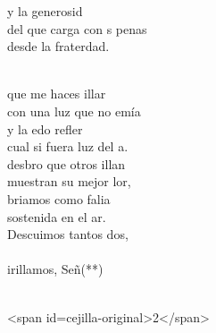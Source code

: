 \begin{cancion}
	y la generosid\\
	del que carga con s penas\\
	desde la fraterdad. \\\jump\\
	\begin{chorus}%
	 que  me haces illar \\
	con una luz que no emía\\
	y la edo refler\\
	cual si fuera luz del a. \\
	desbro que otros illan\\
	muestran su mejor lor,\\
	briamos como falia\\
	sostenida en el ar.\\
	Descuimos tantos dos,\\
{}\vspace*{-0.4cm}\\
	irillamos, Señ(**) \\
	\end{chorus}%
	\jump\\
<span id=cejilla-original>2</span>\\
\end{cancion}%
